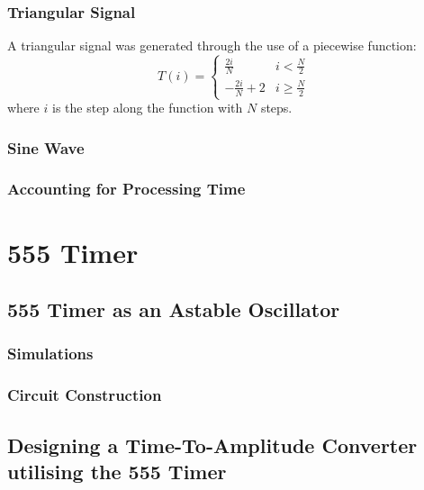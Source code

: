\documentclass[%
 reprint,
 amsmath,amssymb,
 aps,
]{revtex4-2}
\begin{document}
        \subsubsection{Triangular Signal}
        A triangular signal was generated through the use of a piecewise function:
        \[T(i) = 
        \begin{cases}
            \frac{2i}{N} & i < \frac{N}{2}\\
            -\frac{2i}{N} + 2 & i \ge \frac{N}{2}
        \end{cases}
        \]
        where $i$ is the step along the function with $N$ steps.

        \subsubsection{Sine Wave}

        \subsubsection{Accounting for Processing Time}

\section{555 Timer}
    
    \subsection{555 Timer as an Astable Oscillator}

        \subsubsection{Simulations}

        \subsubsection{Circuit Construction}


    \subsection{Designing a Time-To-Amplitude Converter utilising the 555 Timer}


\clearpage


\clearpage
\onecolumngrid
\appendix
\end{document}
